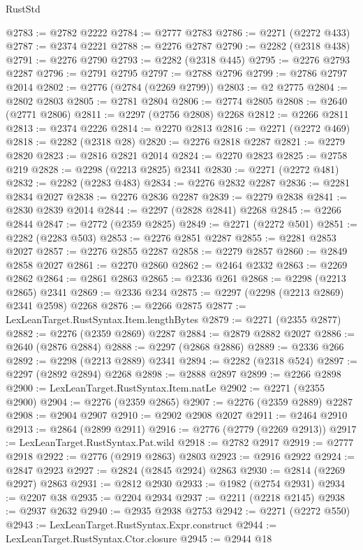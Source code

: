 \begin{lexlean}{RustStd}
\begin{coremodule}
@2783 := @2782 @2222
@2784 := @2777 @2783
@2786 := @2271 (@2272 @433)
@2787 := @2374 @2221
@2788 := @2276 @2787
@2790 := @2282 (@2318 @438)
@2791 := @2276 @2790
@2793 := @2282 (@2318 @445)
@2795 := @2276 @2793 @2287
@2796 := @2791 @2795
@2797 := @2788 @2796
@2799 := @2786 @2797 @2014
@2802 := @2776 (@2784 (@2269 @2799))
@2803 := @2 @2775
@2804 := @2802 @2803
@2805 := @2781 @2804
@2806 := @2774 @2805
@2808 := @2640 (@2771 @2806)
@2811 := @2297 (@2756 @2808) @2268
@2812 := @2266 @2811
@2813 := @2374 @2226
@2814 := @2270 @2813
@2816 := @2271 (@2272 @469)
@2818 := @2282 (@2318 @28)
@2820 := @2276 @2818 @2287
@2821 := @2279 @2820
@2823 := @2816 @2821 @2014
@2824 := @2270 @2823
@2825 := @2758 @219
@2828 := @2298 (@2213 @2825) @2341
@2830 := @2271 (@2272 @481)
@2832 := @2282 (@2283 @483)
@2834 := @2276 @2832 @2287
@2836 := @2281 @2834 @2027
@2838 := @2276 @2836 @2287
@2839 := @2279 @2838
@2841 := @2830 @2839 @2014
@2844 := @2297 (@2828 @2841) @2268
@2845 := @2266 @2844
@2847 := @2772 (@2359 @2825)
@2849 := @2271 (@2272 @501)
@2851 := @2282 (@2283 @503)
@2853 := @2276 @2851 @2287
@2855 := @2281 @2853 @2027
@2857 := @2276 @2855 @2287
@2858 := @2279 @2857
@2860 := @2849 @2858 @2027
@2861 := @2270 @2860
@2862 := @2464 @2332
@2863 := @2269 @2862
@2864 := @2861 @2863
@2865 := @2336 @261
@2868 := @2298 (@2213 @2865) @2341
@2869 := @2336 @234
@2875 := @2297 (@2298 (@2213 @2869) @2341 @2598) @2268
@2876 := @2266 @2875
@2877 := LexLeanTarget.RustSyntax.Item.lengthBytes
@2879 := @2271 (@2355 @2877)
@2882 := @2276 (@2359 @2869) @2287
@2884 := @2879 @2882 @2027
@2886 := @2640 (@2876 @2884)
@2888 := @2297 (@2868 @2886)
@2889 := @2336 @266
@2892 := @2298 (@2213 @2889) @2341
@2894 := @2282 (@2318 @524)
@2897 := @2297 (@2892 @2894) @2268
@2898 := @2888 @2897
@2899 := @2266 @2898
@2900 := LexLeanTarget.RustSyntax.Item.natLe
@2902 := @2271 (@2355 @2900)
@2904 := @2276 (@2359 @2865)
@2907 := @2276 (@2359 @2889) @2287
@2908 := @2904 @2907
@2910 := @2902 @2908 @2027
@2911 := @2464 @2910
@2913 := @2864 (@2899 @2911)
@2916 := @2776 (@2779 (@2269 @2913))
@2917 := LexLeanTarget.RustSyntax.Pat.wild
@2918 := @2782 @2917
@2919 := @2777 @2918
@2922 := @2776 (@2919 @2863) @2803
@2923 := @2916 @2922
@2924 := @2847 @2923
@2927 := @2824 (@2845 @2924) @2863
@2930 := @2814 (@2269 @2927) @2863
@2931 := @2812 @2930
@2933 := @1982 (@2754 @2931)
@2934 := @2207 @38
@2935 := @2204 @2934
@2937 := @2211 (@2218 @2145)
@2938 := @2937 @2632
@2940 := @2935 @2938 @2753
@2942 := @2271 (@2272 @550)
@2943 := LexLeanTarget.RustSyntax.Expr.construct
@2944 := LexLeanTarget.RustSyntax.Ctor.closure
@2945 := @2944 @18

\end{coremodule}
\end{lexlean}
